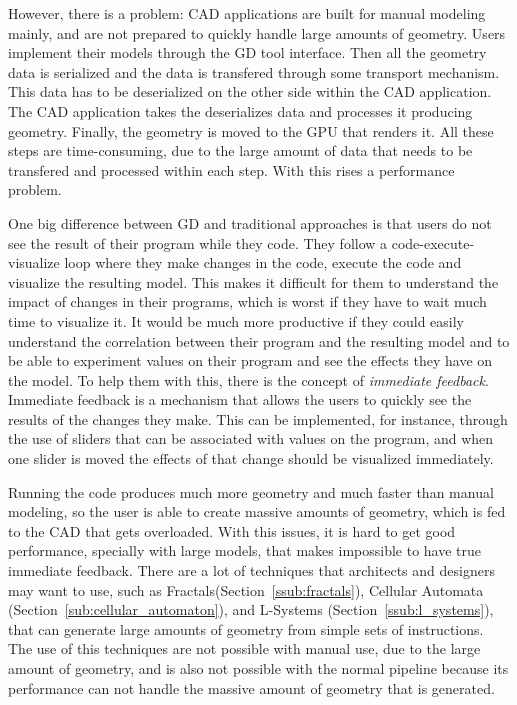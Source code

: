 
However, there is a problem: CAD applications are built for manual modeling mainly, and are not prepared to quickly handle large amounts of geometry.
Users implement their models through the GD tool interface. Then all the geometry data is serialized and the data is transfered through some transport mechanism. This data has to be deserialized on the other side within the CAD application. The CAD application takes the deserializes data and processes it producing geometry. Finally, the geometry is moved to the GPU that renders it. All these steps are time-consuming, due to the large amount of data that needs to be transfered and processed within each step. With this rises a performance problem.

One big difference between GD and traditional approaches is that users do not see the result of their program while they code. They follow a code-execute-visualize loop where they make changes in the code, execute the code and visualize the resulting model. This makes it difficult for them to understand the impact of changes in their programs, which is worst if they have to wait much time to visualize it. It would be much more productive if they could easily understand the correlation between their program and the resulting model and to be able to experiment values on their program and see the effects they have on the model. To help them with this, there is the concept of \emph{immediate feedback}. Immediate feedback is a mechanism that allows the users to quickly see the results of the changes they make. This can be implemented, for instance, through the use of sliders that can be associated with values on the program, and when one slider is moved the effects of that change should be visualized immediately. 

Running the code produces much more geometry and much faster than manual modeling, so the user is able to create massive amounts of geometry, which is fed to the CAD that gets overloaded. With this issues, it is hard to get good performance, specially with large models, that makes impossible to have true immediate feedback. There are a lot of techniques that architects and designers may want to use, such as Fractals(Section~\ref{ssub:fractals}), Cellular Automata (Section~\ref{sub:cellular_automaton}), and L-Systems (Section~\ref{ssub:l_systems}), that can generate large amounts of geometry from simple sets of instructions. The use of this techniques are not possible with manual use, due to the large amount of geometry, and is also not possible with the normal pipeline because its performance can not handle the massive amount of geometry that is generated.


